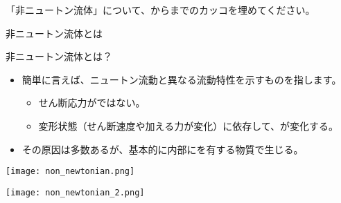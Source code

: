 \documentclass[uplatex,dvipdfmx,a4paper,11pt]{jsreport}
\begin{document}
\begin{qlist}
	\qitem 「非ニュートン流体」について、からまでのカッコを埋めてください。

			\vspace{3mm}
			\begin{qlist2}
			\qitem 非ニュートン流体とは
			\begin{center}
				\begin{minipage}{0.9\textwidth}
					\begin{itembox}[l]{非ニュートン流体とは？}
						\begin{itemize}
							\item 簡単に言えば、ニュートン流動と異なる流動特性を示すものを指します。
							\begin{itemize}
								\item せん断応力が\qbox{}ではない。
								\item 変形状態（せん断速度や加える力が変化）に依存して、\qbox{}が変化する。
							\end{itemize}
							\item その原因は多数あるが、基本的に内部に\qbox{}を有する物質で生じる。
						\end{itemize}
					\end{itembox}
				\end{minipage}

				\vspace{4mm}

				\begin{minipage}{0.43\textwidth}
					\begin{center}
					\texttt{[image: non\_newtonian.png]}
					\end{center}
				\end{minipage}
				\begin{minipage}{0.43\textwidth}
					\begin{center}
					\texttt{[image: non\_newtonian\_2.png]}
					\end{center}
				\end{minipage}
			\end{center}


\end{qlist2}
\end{qlist}
\end{document}
